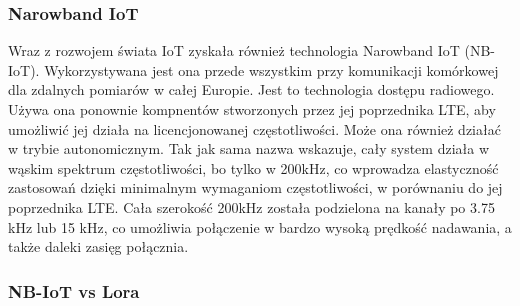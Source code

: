 \subsubsection{Narowband IoT}
Wraz z rozwojem świata IoT zyskała również technologia Narowband IoT (NB-IoT). Wykorzystywana jest ona przede wszystkim przy komunikacji komórkowej dla zdalnych pomiarów w całej Europie. Jest to technologia dostępu radiowego. Używa ona ponownie kompnentów stworzonych przez jej poprzednika LTE, aby umożliwić jej działa na licencjonowanej częstotliwości. Może ona również działać w trybie autonomicznym. Tak jak sama nazwa wskazuje, cały system działa w wąskim spektrum częstotliwości, bo tylko w 200kHz, co wprowadza elastyczność zastosowań dzięki minimalnym wymaganiom częstotliwości, w porównaniu do jej poprzednika LTE. Cała szerokość 200kHz została podzielona na kanały po 3.75 kHz lub 15 kHz, co umożliwia połączenie w bardzo wysoką prędkość nadawania, a także daleki zasięg połącznia. \cite{nbiot-article}  

\subsubsection{NB-IoT vs Lora}

